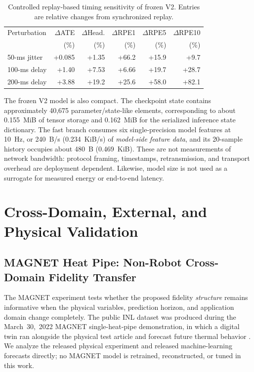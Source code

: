 \documentclass[journal]{IEEEtran}
\begin{document}
\begin{table}[t]
\caption{Controlled replay-based timing sensitivity of frozen V2. Entries are relative changes from synchronized replay.}
\label{tab:timing}
\centering
\scriptsize
\setlength{\tabcolsep}{2.4pt}
\begin{tabular}{lrrrrr}
\toprule
Perturbation & $\Delta$ATE & $\Delta$Head. & $\Delta$RPE1 & $\Delta$RPE5 & $\Delta$RPE10 \\
 & (\%) & (\%) & (\%) & (\%) & (\%) \\
\midrule
50-ms jitter & +0.085 & +1.35 & +66.2 & +15.9 & +9.7 \\
100-ms delay & +1.40 & +7.53 & +6.66 & +19.7 & +28.7 \\
200-ms delay & +3.88 & +19.2 & +25.6 & +58.0 & +82.1 \\
\bottomrule
\end{tabular}
\end{table}

The frozen V2 model is also compact. The checkpoint state contains approximately 40,675 parameter/state-like elements, corresponding to about 0.155~MiB of tensor storage and 0.162~MiB for the serialized inference state dictionary. The fast branch consumes six single-precision model features at 10~Hz, or 240~B/s (0.234~KiB/s) of \emph{model-side feature data}, and its 20-sample history occupies about 480~B (0.469~KiB). These are not measurements of network bandwidth: protocol framing, timestamps, retransmission, and transport overhead are deployment dependent. Likewise, model size is not used as a surrogate for measured energy or end-to-end latency.

\section{Cross-Domain, External, and Physical Validation}

\subsection{MAGNET Heat Pipe: Non-Robot Cross-Domain Fidelity Transfer}
\label{sec:magnet}
The MAGNET experiment tests whether the proposed fidelity \emph{structure} remains informative when the physical variables, prediction horizon, and application domain change completely. The public INL dataset was produced during the March~30,~2022 MAGNET single-heat-pipe demonstration, in which a digital twin ran alongside the physical test article and forecast future thermal behavior \cite{wilsdon2023magnet,inlmagnetdata}. We analyze the released physical experiment and released machine-learning forecasts directly; no MAGNET model is retrained, reconstructed, or tuned in this work.
\end{document}
